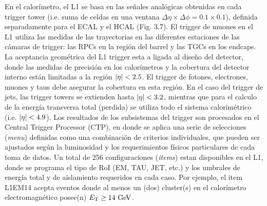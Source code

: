 En el calorímetro, el L1 se basa en las se\~nales analógicas obtenidas en cada
trigger tower (i.e. suma de celdas en una ventana $\Delta \eta \times \Delta
\phi = 0.1 \times 0.1$), definida separadamente para el ECAL y el HCAL (Fig.
3.7). El trigger de muones en el L1 utiliza las medidas de las trayectorias en
las diferentes estaciones de las cámaras de trigger: las RPCs en la región del
barrel y las TGCs en los endcaps. La aceptancia geométrica del L1 trigger esta a
ligada al dise\~no del detector, donde las medidas de precisión en los
calorímetros y la cobertura del detector interno están limitadas a la región
$\abseta < 2.5$. El trigger de fotones, electrones, muones y taus debe asegurar
la cobertura en esta región. En el caso del trigger de jets, las trigger towers
se extienden hasta $\abseta < 3.2$, mientras que para el calculo de la energía
transversa total (perdida) se utiliza todo el sistema calorimétrico (i.e.
$\abseta < 4.9$). Los resultados de los subsistemas del trigger son procesados
en el Central Trigger Processor (CTP), en donde se aplica una serie de
selecciones (\emph{menu}) definidas como una combinación de criterios
individuales, que pueden ser ajustados según la luminosidad y los requerimientos
físicos particulares de cada toma de datos. Un total de 256 configuraciones
(\emph{items}) estan disponibles en el L1, donde se programa el tipo de RoI (EM,
TAU, JET, etc.) y los umbrales de energía total y de aislamiento requeridos en
cada caso. Por ejemplo, el item L1EM14 acepta eventos donde al menos un (dos)
cluster(s) en el calorímetro electromagnético posee(n) $\et \geq 14 \GeV$.

